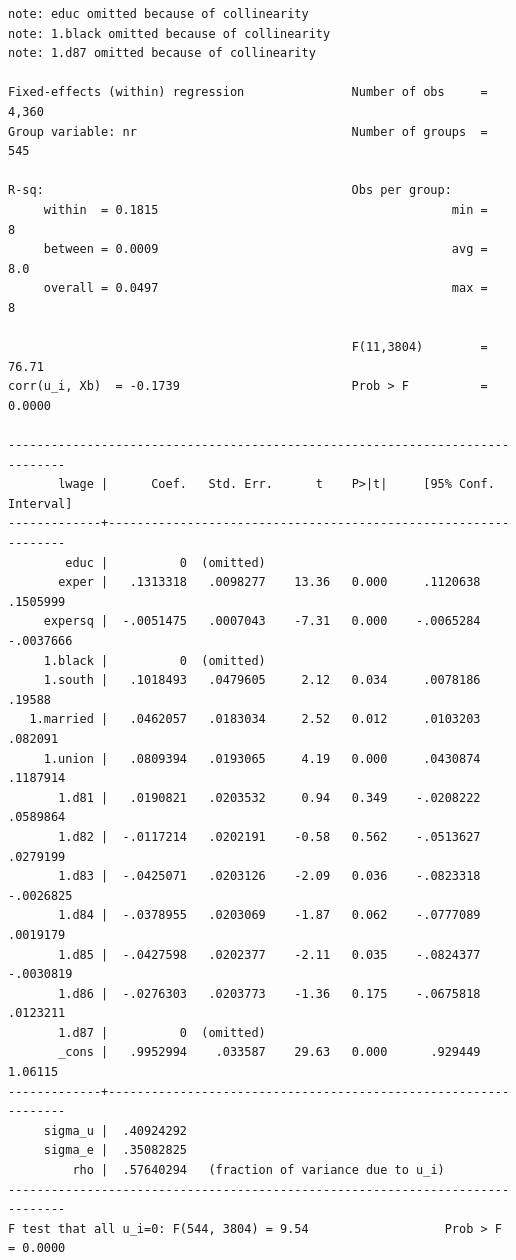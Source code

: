 \documentclass[
]{book}
\begin{document}
\begin{verbatim}
note: educ omitted because of collinearity
note: 1.black omitted because of collinearity
note: 1.d87 omitted because of collinearity

Fixed-effects (within) regression               Number of obs     =      4,360
Group variable: nr                              Number of groups  =        545

R-sq:                                           Obs per group:
     within  = 0.1815                                         min =          8
     between = 0.0009                                         avg =        8.0
     overall = 0.0497                                         max =          8

                                                F(11,3804)        =      76.71
corr(u_i, Xb)  = -0.1739                        Prob > F          =     0.0000

------------------------------------------------------------------------------
       lwage |      Coef.   Std. Err.      t    P>|t|     [95% Conf. Interval]
-------------+----------------------------------------------------------------
        educ |          0  (omitted)
       exper |   .1313318   .0098277    13.36   0.000     .1120638    .1505999
     expersq |  -.0051475   .0007043    -7.31   0.000    -.0065284   -.0037666
     1.black |          0  (omitted)
     1.south |   .1018493   .0479605     2.12   0.034     .0078186      .19588
   1.married |   .0462057   .0183034     2.52   0.012     .0103203     .082091
     1.union |   .0809394   .0193065     4.19   0.000     .0430874    .1187914
       1.d81 |   .0190821   .0203532     0.94   0.349    -.0208222    .0589864
       1.d82 |  -.0117214   .0202191    -0.58   0.562    -.0513627    .0279199
       1.d83 |  -.0425071   .0203126    -2.09   0.036    -.0823318   -.0026825
       1.d84 |  -.0378955   .0203069    -1.87   0.062    -.0777089    .0019179
       1.d85 |  -.0427598   .0202377    -2.11   0.035    -.0824377   -.0030819
       1.d86 |  -.0276303   .0203773    -1.36   0.175    -.0675818    .0123211
       1.d87 |          0  (omitted)
       _cons |   .9952994    .033587    29.63   0.000      .929449     1.06115
-------------+----------------------------------------------------------------
     sigma_u |  .40924292
     sigma_e |  .35082825
         rho |  .57640294   (fraction of variance due to u_i)
------------------------------------------------------------------------------
F test that all u_i=0: F(544, 3804) = 9.54                   Prob > F = 0.0000
\end{verbatim}
\end{document}
